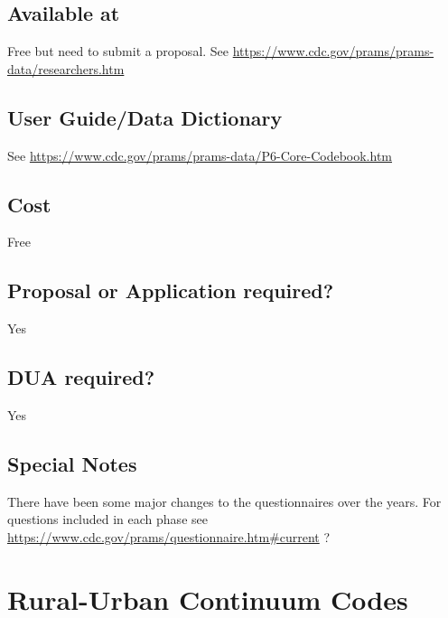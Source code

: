 \documentclass[
]{book}
\begin{document}
\hypertarget{available-at-74}{%
\section{Available at}\label{available-at-74}}

Free but need to submit a proposal. See \url{https://www.cdc.gov/prams/prams-data/researchers.htm}

\hypertarget{user-guidedata-dictionary-74}{%
\section{User Guide/Data Dictionary}\label{user-guidedata-dictionary-74}}

See \url{https://www.cdc.gov/prams/prams-data/P6-Core-Codebook.htm}

\hypertarget{cost-74}{%
\section{Cost}\label{cost-74}}

Free

\hypertarget{proposal-or-application-required-74}{%
\section{Proposal or Application required?}\label{proposal-or-application-required-74}}

Yes

\hypertarget{dua-required-74}{%
\section{DUA required?}\label{dua-required-74}}

Yes

\hypertarget{special-notes-74}{%
\section{Special Notes}\label{special-notes-74}}

There have been some major changes to the questionnaires over the years. For questions included in each phase see \url{https://www.cdc.gov/prams/questionnaire.htm\#current} ?

\mainmatter

\hypertarget{rural-urban-continuum-codes}{%
\chapter{Rural-Urban Continuum Codes}\label{rural-urban-continuum-codes}}
\end{document}
